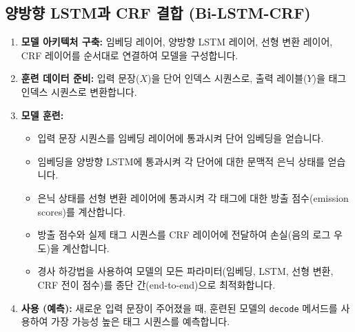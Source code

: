 \documentclass[11pt,a4paper]{article}
\theoremstyle{definition}
\begin{document}
\subsection{양방향 LSTM과 CRF 결합 (Bi-LSTM-CRF)}
\begin{enumerate}
    \item \textbf{모델 아키텍처 구축:} 임베딩 레이어, 양방향 LSTM 레이어, 선형 변환 레이어, CRF 레이어를 순서대로 연결하여 모델을 구성합니다.
    \item \textbf{훈련 데이터 준비:} 입력 문장($X$)을 단어 인덱스 시퀀스로, 출력 레이블($Y$)을 태그 인덱스 시퀀스로 변환합니다.
    \item \textbf{모델 훈련:}
    \begin{itemize}
        \item 입력 문장 시퀀스를 임베딩 레이어에 통과시켜 단어 임베딩을 얻습니다.
        \item 임베딩을 양방향 LSTM에 통과시켜 각 단어에 대한 문맥적 은닉 상태를 얻습니다.
        \item 은닉 상태를 선형 변환 레이어에 통과시켜 각 태그에 대한 방출 점수(emission scores)를 계산합니다.
        \item 방출 점수와 실제 태그 시퀀스를 CRF 레이어에 전달하여 손실(음의 로그 우도)을 계산합니다.
        \item 경사 하강법을 사용하여 모델의 모든 파라미터(임베딩, LSTM, 선형 변환, CRF 전이 점수)를 종단 간(end-to-end)으로 최적화합니다.
    \end{itemize}
    \item \textbf{사용 (예측):} 새로운 입력 문장이 주어졌을 때, 훈련된 모델의 \texttt{decode} 메서드를 사용하여 가장 가능성 높은 태그 시퀀스를 예측합니다.
\end{enumerate}
\end{document}
